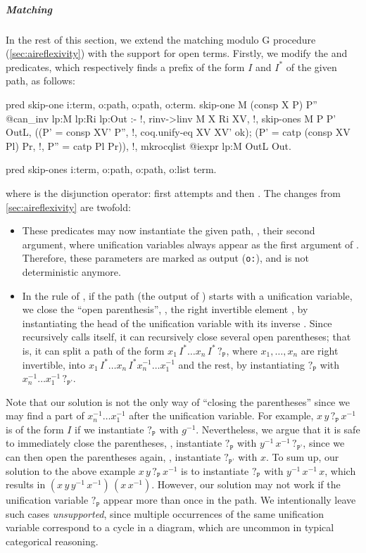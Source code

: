 \documentclass[a4paper,UKenglish,cleveref,autoref]{lipics-v2021}
\newcommand\evar[1]{\ensuremath{?_{\texttt{#1}}}}
\begin{document}
\subparagraph{Matching}
In the rest of this section, we extend the matching modulo G procedure (\cref{sec:aireflexivity})
with the support for open terms.
Firstly, we modify the  and  predicates, which respectively finds a
prefix of the form $I$ and $I^*$ of the given path, as follows:
\begin{elpicode}
pred skip-one i:term, o:path, o:path, o:term.
skip-one M (consp X P) P'' {{ @can_inv lp:M lp:Ri lp:Out }} :- !,
  rinv->linv M X Ri XV, !,
  skip-ones M P P' OutL,
  ((P' = consp XV' P'', !, coq.unify-eq XV XV' ok);
   (P' = catp (consp XV Pl) Pr, !, P'' = catp Pl Pr)),
  !,
  mkrocqlist {{ @iexpr lp:M }} OutL Out.

pred skip-ones i:term, o:path, o:path, o:list term.
\end{elpicode}
where \elpi{;} is the disjunction operator:  first attempts  and then .
The changes from \cref{sec:aireflexivity} are twofold:
\begin{itemize}
\item These predicates may now instantiate the given path, \ie, their second argument, where
  unification variables always appear as the first argument of .
  Therefore, these parameters are marked as output (\texttt{o:}), and  is not
  deterministic anymore.
\item In the rule of , if the path  (the output of ) starts
  with a unification variable, we close the ``open parenthesis'', \ie, the right invertible element
  , by instantiating the head of the unification variable with its inverse .
  Since  recursively calls itself, it can recursively close several open parentheses;
  that is, it can split a path of the form $x_1 \, I^* \dots x_n \, I^* \, \evar{P}$, where
  $x_1, \dots, x_n$ are right invertible, into $x_1 \, I^* \dots x_n \, I^* x_n^{-1} \dots x_1^{-1}$
  and the rest, by instantiating $\evar{P}$ with $x_n^{-1} \dots x_1^{-1} \, \evar{P'}$.
\end{itemize}
Note that our solution is not the only way of ``closing the parentheses'' since we may find a part
of $x_n^{-1} \dots x_1^{-1}$ after the unification variable.
For example, $x \, y \, \evar{P} \, x^{-1}$ is of the form $I$ if we instantiate $\evar{P}$ with
$g^{-1}$.
Nevertheless, we argue that it is safe to immediately close the parentheses, \ie, instantiate
$\evar{P}$ with $y^{-1} \, x^{-1} \, \evar{P'}$, since we can then open the parentheses again, \ie,
instantiate $\evar{P'}$ with $x$.
To sum up, our solution to the above example $x \, y \, \evar{P} \, x^{-1}$ is to instantiate
$\evar{P}$ with $y^{-1} \, x^{-1} \, x$, which results in
$(x \, y \, y^{-1} \, x^{-1}) \, (x \, x^{-1})$.
However, our solution may not work if the unification variable $\evar{P}$ appear more than once in
the path.
We intentionally leave such cases \emph{unsupported}, since multiple occurrences of the same
unification variable correspond to a cycle in a diagram, which are uncommon in typical categorical
reasoning.
\end{document}
